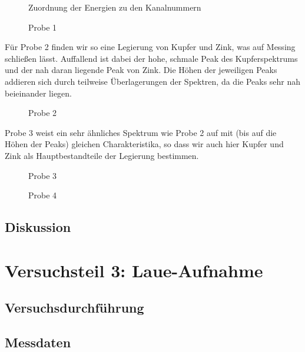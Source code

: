 \documentclass[10pt, a4paper]{article}
\begin{document}
\begin{figure}[h]
\centering

\caption{Zuordnung der Energien zu den Kanalnummern}
\label{fig:energieeichung}
\end{figure}

\clearpage

\begin{figure}[h]
\centering

\caption{Probe 1}
\label{fig:probe1}
\end{figure}

Für Probe 2 finden wir so eine Legierung von Kupfer und Zink, was auf Messing schließen lässt.
Auffallend ist dabei der hohe, schmale Peak des Kupferspektrums und der nah daran liegende Peak von Zink.
Die Höhen der jeweiligen Peaks addieren sich durch teilweise Überlagerungen der Spektren, da die Peaks sehr nah beieinander liegen.

\begin{figure}[!h]
\centering

\caption{Probe 2}
\label{fig:probe2}
\end{figure}

Probe 3 weist ein sehr ähnliches Spektrum wie Probe 2 auf mit (bis auf die Höhen der Peaks) gleichen Charakteristika, so dass wir auch hier Kupfer und Zink als Hauptbestandteile der Legierung bestimmen.

\begin{figure}[!h]
\centering

\caption{Probe 3}
\label{fig:probe3}
\end{figure}

\begin{figure}[h]
\centering

\caption{Probe 4}
\label{fig:probe4}
\end{figure}

\subsection{Diskussion}

\section{Versuchsteil 3: Laue-Aufnahme}
\subsection{Versuchsdurchführung}



\subsection{Messdaten}
\end{document}
